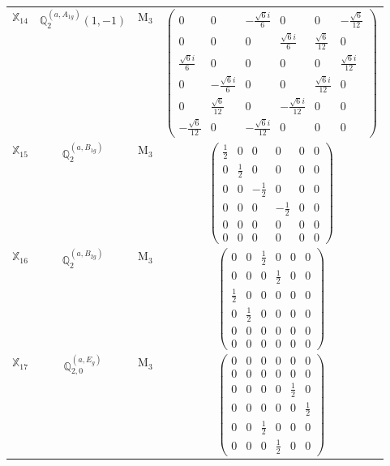 \documentclass[fleqn,10pt,landscape]{article}
\begin{document}
\begin{itemize}
\begin{center}
\begin{longtable}{c|c|c|c}
$ \mathbb{X}_{14} $ & $\mathbb{Q}_{2}^{(a,A_{1g})}(1,-1)$ & M$_{3}$ & $\begin{pmatrix} 0 & 0 & - \frac{\sqrt{6} i}{6} & 0 & 0 & - \frac{\sqrt{6}}{12} \\ 0 & 0 & 0 & \frac{\sqrt{6} i}{6} & \frac{\sqrt{6}}{12} & 0 \\ \frac{\sqrt{6} i}{6} & 0 & 0 & 0 & 0 & \frac{\sqrt{6} i}{12} \\ 0 & - \frac{\sqrt{6} i}{6} & 0 & 0 & \frac{\sqrt{6} i}{12} & 0 \\ 0 & \frac{\sqrt{6}}{12} & 0 & - \frac{\sqrt{6} i}{12} & 0 & 0 \\ - \frac{\sqrt{6}}{12} & 0 & - \frac{\sqrt{6} i}{12} & 0 & 0 & 0 \end{pmatrix}$ \\
$ \mathbb{X}_{15} $ & $\mathbb{Q}_{2}^{(a,B_{1g})}$ & M$_{3}$ & $\begin{pmatrix} \frac{1}{2} & 0 & 0 & 0 & 0 & 0 \\ 0 & \frac{1}{2} & 0 & 0 & 0 & 0 \\ 0 & 0 & - \frac{1}{2} & 0 & 0 & 0 \\ 0 & 0 & 0 & - \frac{1}{2} & 0 & 0 \\ 0 & 0 & 0 & 0 & 0 & 0 \\ 0 & 0 & 0 & 0 & 0 & 0 \end{pmatrix}$ \\
$ \mathbb{X}_{16} $ & $\mathbb{Q}_{2}^{(a,B_{2g})}$ & M$_{3}$ & $\begin{pmatrix} 0 & 0 & \frac{1}{2} & 0 & 0 & 0 \\ 0 & 0 & 0 & \frac{1}{2} & 0 & 0 \\ \frac{1}{2} & 0 & 0 & 0 & 0 & 0 \\ 0 & \frac{1}{2} & 0 & 0 & 0 & 0 \\ 0 & 0 & 0 & 0 & 0 & 0 \\ 0 & 0 & 0 & 0 & 0 & 0 \end{pmatrix}$ \\
$ \mathbb{X}_{17} $ & $\mathbb{Q}_{2,0}^{(a,E_{g})}$ & M$_{3}$ & $\begin{pmatrix} 0 & 0 & 0 & 0 & 0 & 0 \\ 0 & 0 & 0 & 0 & 0 & 0 \\ 0 & 0 & 0 & 0 & \frac{1}{2} & 0 \\ 0 & 0 & 0 & 0 & 0 & \frac{1}{2} \\ 0 & 0 & \frac{1}{2} & 0 & 0 & 0 \\ 0 & 0 & 0 & \frac{1}{2} & 0 & 0 \end{pmatrix}$ \\

\end{longtable}
\end{center}
\end{itemize}
\end{document}
